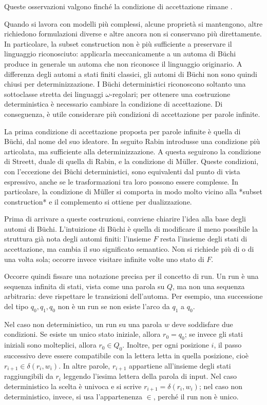 Queste osservazioni valgono finché la condizione di accettazione rimane .

Quando si lavora con modelli più complessi, alcune proprietà si mantengono, altre richiedono formulazioni diverse e altre ancora non si conservano più direttamente. In particolare, la subset construction non è più sufficiente a preservare il linguaggio riconosciuto: applicarla meccanicamente a un automa di Büchi produce in generale un automa che non riconosce il linguaggio originario. A differenza degli automi a stati finiti classici, gli automi di Büchi non sono quindi chiusi per determinizzazione. I Büchi deterministici riconoscono soltanto una sottoclasse stretta dei linguaggi \(\omega\)-regolari; per ottenere una costruzione deterministica è necessario cambiare la condizione di accettazione. Di conseguenza, è utile considerare più condizioni di accettazione per parole infinite.

La prima condizione di accettazione proposta per parole infinite è quella di Büchi, dal nome del suo ideatore. In seguito Rabin introdusse una condizione più articolata, ma sufficiente alla determinizzazione. A questa seguirono la condizione di Streett, duale di quella di Rabin, e la condizione di Müller. Queste condizioni, con l'eccezione dei Büchi deterministici, sono equivalenti dal punto di vista espressivo, anche se le trasformazioni tra loro possono essere complesse. In particolare, la condizione di Müller si comporta in modo molto vicino alla *subset construction* e il complemento si ottiene per dualizzazione.

Prima di arrivare a queste costruzioni, conviene chiarire l'idea alla base degli automi di Büchi. L'intuizione di Büchi è quella di modificare il meno possibile la struttura già nota degli automi finiti: l'insieme \(F\) resta l'insieme degli stati di accettazione, ma cambia il suo significato semantico. Non si richiede più di  o di  una volta sola; occorre invece visitare infinite volte uno stato di \(F\).

Occorre quindi fissare una notazione precisa per il concetto di run. Un run è una sequenza infinita di stati, vista come una parola su \(Q\), ma non una sequenza arbitraria: deve rispettare le transizioni dell'automa. Per esempio, una successione del tipo \(q_0, q_1, q_0\) non è un run se non esiste l'arco da \(q_1\) a \(q_0\).

Nel caso non deterministico, un run su una parola \(w\) deve soddisfare due condizioni. Se esiste un unico stato iniziale, allora \(r_0 = q_0\); se invece gli stati iniziali sono molteplici, allora \(r_0 \in Q_0\). Inoltre, per ogni posizione \(i\), il passo successivo deve essere compatibile con la lettera letta in quella posizione, cioè \(r_{i+1} \in \delta(r_i, w_i)\). In altre parole, \(r_{i+1}\) appartiene all'insieme degli stati raggiungibili da \(r_i\) leggendo l'iesima lettera della parola di input. Nel caso deterministico la scelta è univoca e si scrive \(r_{i+1} = \delta(r_i, w_i)\); nel caso non deterministico, invece, si usa l'appartenenza \(\in\), perché il run non è unico.